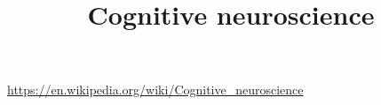 \documentclass[a4paper]{article}
\title{Cognitive neuroscience}
\date{}
\begin{document}
    \maketitle
    
    \url{https://en.wikipedia.org/wiki/Cognitive_neuroscience}
    
\end{document}
